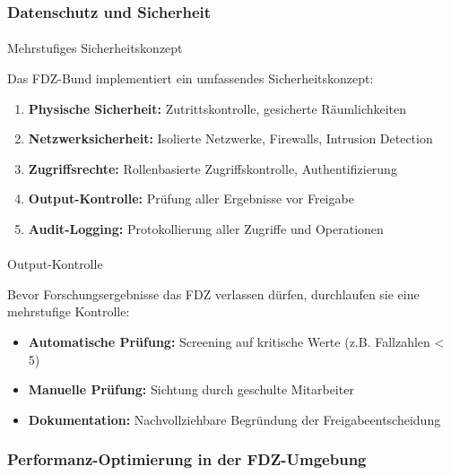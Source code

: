 \documentclass[
  ngerman,
  10pt,
  twocolumn]{article}
\makeatletter
\let\oldparagraph\paragraph
\renewcommand{\paragraph}{
    \@ifstar
      \xxxParagraphStar
      \xxxParagraphNoStar
  }
\newcommand{\xxxParagraphStar}[1]{\oldparagraph*{#1}\mbox{}}
\newcommand{\xxxParagraphNoStar}[1]{\oldparagraph{#1}\mbox{}}
\providecommand{\tightlist}{%
  \setlength{\itemsep}{0pt}\setlength{\parskip}{0pt}}
\makeatother
\begin{document}
\subsubsection{Datenschutz und
Sicherheit}\label{datenschutz-und-sicherheit}

\paragraph{Mehrstufiges
Sicherheitskonzept}\label{mehrstufiges-sicherheitskonzept}

Das FDZ-Bund implementiert ein umfassendes Sicherheitskonzept:

\begin{enumerate}
\def\labelenumi{\arabic{enumi}.}
\tightlist
\item
  \textbf{Physische Sicherheit:} Zutrittskontrolle, gesicherte
  Räumlichkeiten
\item
  \textbf{Netzwerksicherheit:} Isolierte Netzwerke, Firewalls, Intrusion
  Detection
\item
  \textbf{Zugriffsrechte:} Rollenbasierte Zugriffskontrolle,
  Authentifizierung
\item
  \textbf{Output-Kontrolle:} Prüfung aller Ergebnisse vor Freigabe
\item
  \textbf{Audit-Logging:} Protokollierung aller Zugriffe und Operationen
\end{enumerate}

\paragraph{Output-Kontrolle}\label{output-kontrolle}

Bevor Forschungsergebnisse das FDZ verlassen dürfen, durchlaufen sie
eine mehrstufige Kontrolle:

\begin{itemize}
\tightlist
\item
  \textbf{Automatische Prüfung:} Screening auf kritische Werte (z.B.
  Fallzahlen \textless{} 5)
\item
  \textbf{Manuelle Prüfung:} Sichtung durch geschulte Mitarbeiter
\item
  \textbf{Dokumentation:} Nachvollziehbare Begründung der
  Freigabeentscheidung
\end{itemize}

\subsubsection{Performanz-Optimierung in der
FDZ-Umgebung}\label{performanz-optimierung-in-der-fdz-umgebung}
\end{document}
